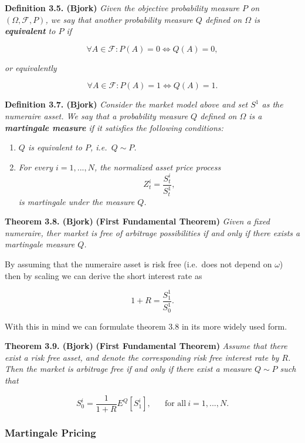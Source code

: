 \documentclass[a4paper,12pt,openany]{book}
\providecommand{\tightlist}{%
 \setlength{\itemsep}{0pt}\setlength{\parskip}{0pt}}
\begin{document}
\textbf{Definition 3.5. (Bjork)} \emph{Given the objective probability measure \(P\) on \((\Omega,\mathcal{F},P)\), we say that another probability measure \(Q\) defined on \(\Omega\) is \textbf{equivalent} to \(P\) if}

\[
\forall A\in\mathcal{F}:P(A)=0\iff Q(A)=0,
\]

\emph{or equivalently}

\[
\forall A\in\mathcal{F}:P(A)=1\iff Q(A)=1.
\]

\textbf{Definition 3.7. (Bjork)} \emph{Consider the market model above and set \(S^1\) as the numeraire asset. We say that a probability measure \(Q\) defined on \(\Omega\) is a \textbf{martingale measure} if it satisfies the following conditions:}

\begin{enumerate}
\def\labelenumi{\arabic{enumi}.}
\tightlist
\item
  \emph{\(Q\) is equivalent to \(P\), i.e.~\(Q\sim P\).}
\item
  \emph{For every \(i=1,...,N\), the normalized asset price process}
  \[
    Z_t^i=\frac{S_t^i}{S_t^1},
    \]
  \emph{is martingale under the measure \(Q\).}
\end{enumerate}

\textbf{Theorem 3.8. (Bjork)} \textbf{(First Fundamental Theorem)} \emph{Given a fixed numeraire, ther market is free of arbitrage possibilities if and only if there exists a martingale measure \(Q\).}

By assuming that the numeraire asset is risk free (i.e.~does not depend on \(\omega\)) then by scaling we can derive the short interest rate as

\[
1+R=\frac{S_1^1}{S_0^1}.
\]

With this in mind we can formulate theorem 3.8 in its more widely used form.

\textbf{Theorem 3.9. (Bjork)} \textbf{(First Fundamental Theorem)} \emph{Assume that there exist a risk free asset, and denote the corresponding risk free interest rate by \(R\). Then the market is arbitrage free if and only if there exist a measure \(Q\sim P\) such that}

\[
S_0^i=\frac{1}{1+R}E^Q[S_1^i],\hspace{20pt}\text{for all}\ i=1,...,N.\tag{3.9}
\]

\hypertarget{martingale-pricing}{%
\subsubsection{Martingale Pricing}\label{martingale-pricing}}
\end{document}
